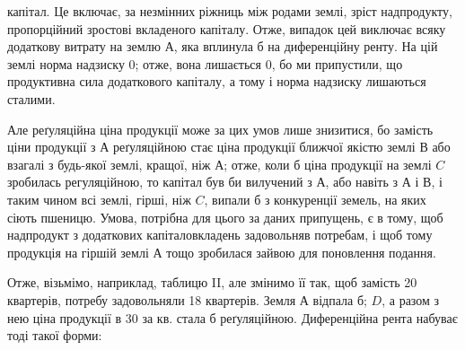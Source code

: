 \parcont{}  %
капітал. Це включає, за незмінних ріжниць між родами землі, зріст надпродукту,
пропорційний зростові вкладеного капіталу. Отже, випадок цей виключає всяку
додаткову витрату на землю $А$, яка вплинула б на диференційну ренту. На цій землі
норма надзиску \deq{} 0; отже, вона лишається \deq{} 0, бо ми припустили, що продуктивна
сила додаткового капіталу, а тому і норма надзиску лишаються сталими.

Але реґуляційна ціна продукції може за цих умов лише знизитися, бо замість
ціни продукції з $А$ реґуляційною стає ціна продукції ближчої якістю землі
$В$ або взагалі з будь-якої землі, кращої, ніж $А$; отже, коли б ціна продукції
на землі $C$ зробилась регуляційною, то капітал був би вилучений з $А$,
або навіть з $А$ і $В$, і таким чином всі землі, гірші, ніж $C$, випали б з конкуренції
земель, на яких сіють пшеницю. Умова, потрібна для цього за даних
припущень, є в тому, щоб надпродукт з додаткових капіталовкладень задовольняв
потребам, і щоб тому продукція на гіршій землі $А$ тощо зробилася
зайвою для поновлення подання.

Отже, візьмімо, наприклад, таблицю II, але змінимо її так, щоб замість 20
квартерів, потребу задовольняли 18 квартерів. Земля $А$ відпала б; $D$, а
разом з нею ціна продукції в 30 за кв. стала б реґуляційною. Диференційна
рента набуває тоді такої форми:

